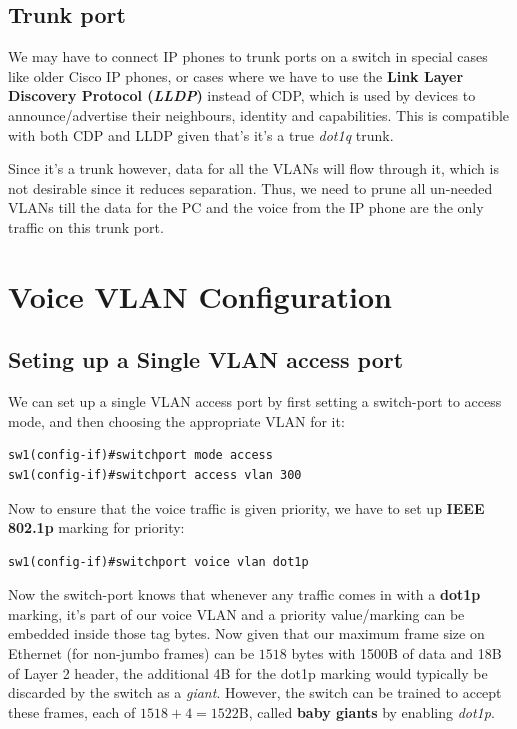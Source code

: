 \subsection{Trunk port}
We may have to connect IP phones to trunk ports on a switch in special cases like older Cisco IP phones, or cases where we have to use the \textbf{Link Layer Discovery Protocol (\textit{LLDP})} instead of CDP, which is used by devices to announce/advertise their neighbours, identity and capabilities. This is compatible with both CDP and LLDP given that's it's a true \textit{dot1q} trunk. 

Since it's a trunk however, data for all the VLANs will flow through it, which is not desirable since it reduces separation. Thus, we need to prune all un-needed VLANs till the data for the PC and the voice from the IP phone are the only traffic on this trunk port. 

\section{Voice VLAN Configuration}
\subsection{Seting up a Single VLAN access port}
We can set up a single VLAN access port by first setting a switch-port to access mode, and then choosing the appropriate VLAN for it:

\vspace{-15pt}
\begin{verbatim}
sw1(config-if)#switchport mode access
sw1(config-if)#switchport access vlan 300
\end{verbatim}
\vspace{-10pt}

\noindent
Now to ensure that the voice traffic is given priority, we have to set up \textbf{IEEE 802.1p} marking for priority:

\vspace{-15pt}
\begin{verbatim}
sw1(config-if)#switchport voice vlan dot1p
\end{verbatim}
\vspace{-10pt}

\noindent
Now the switch-port knows that whenever any traffic comes in with a \textbf{dot1p} marking, it's part of our voice VLAN and a priority value/marking can be embedded inside those tag bytes. Now given that our maximum frame size on Ethernet (for non-jumbo frames) can be $1518$ bytes with 1500B of data and 18B of Layer 2 header, the additional 4B for the dot1p marking would typically be discarded by the switch as a \textit{giant}. However, the switch can be trained to accept these frames, each of $1518+4 = 1522$B, called \textbf{baby giants} by enabling \textit{dot1p}. 

